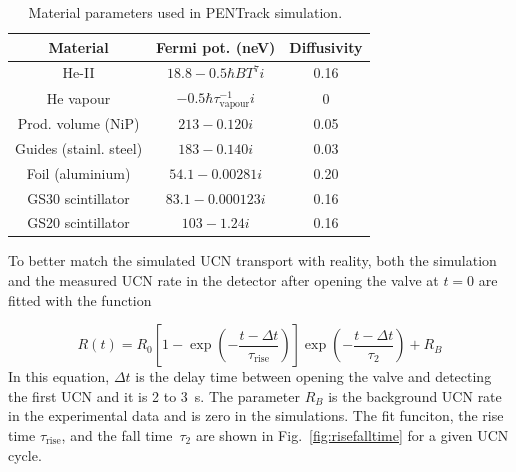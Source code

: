 

\begin{table}
  \centering
\begin{tabular}{|c|c|c|}
  \hline
Material & Fermi pot. (neV) & Diffusivity \\
\hline
  He-II  & $18.8 - 0.5\hbar B T^7 i$ & 0.16 \\
  He vapour & $-0.5 \hbar \tau^{-1}_\mathrm{vapour} i$ & 0 \\
  Prod. volume (NiP) & $213 - 0.120 i$ & 0.05 \\
  Guides (stainl. steel) & $183 - 0.140 i$ & 0.03 \\
  Foil (aluminium) & $54.1 - 0.00281 i$ & 0.20 \\
  GS30 scintillator & $83.1 - 0.000123 i$ & 0.16 \\
  GS20 scintillator & $103 - 1.24 i$ & 0.16 \\
  \hline
\end{tabular}
\caption{Material parameters used in PENTrack
  simulation.~\cite{atchison2009transmission,Ban2016,sears1992neutron}}
\label{tab:materials}
\end{table}


To better match the simulated UCN transport with reality, both the
simulation and the measured UCN rate in the detector after opening the
valve at $t=0$ are fitted with the function

\begin{equation}
R(t) = R_0 \left[ 1 - \exp \left( -\frac{t - \Delta t}{\tau_\mathrm{rise}} \right) \right] \exp \left( -\frac{t - \Delta t}{\tau_2} \right) + R_B
\end{equation}
In this equation, $\Delta t$ is the delay time between opening the
valve and detecting the first UCN and it is 2 to 3~s. The parameter
$R_B$ is the background UCN rate in the experimental data and is zero
in the simulations. The fit funciton, the rise time
$\tau_{\mathrm{rise}}$, and the fall time~$\tau_2$ are shown in
Fig.~\ref{fig:risefalltime} for a given UCN cycle.

